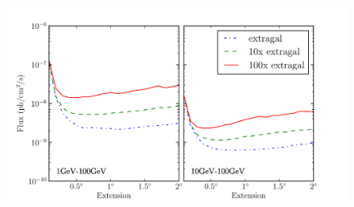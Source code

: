 \documentclass[12pt,preprint]{aastex}
\begin{document}
\clearpage

\begin{figure}
  \begin{center}
    \includegraphics{mc_plots/diff_factor_sensitivity.pdf}
    \end{center}
    \caption{
    }\label{diff_factor_sensitivity}
  \end{figure}
\end{document}
